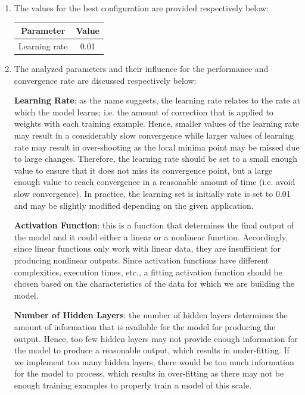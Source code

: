 \documentclass[12pt,a4paper]{article}
\begin{document}
	\begin{enumerate}
		\item The values for the best configuration are provided respectively below:
		\begin{center}
			
			\begin{tabular}{|c|c|}
				\hline
				Parameter& Value \\ \hline
				Learning rate& 0.01 \\ \hline
			\end{tabular}
		\end{center}
	
		\item The analyzed parameters and their influence for the performance and convergence rate are discussed respectively below:
		
		\noindent \textbf{\small Learning Rate}: as the name suggests, the learning rate relates to the rate at which the model learns; i.e. the amount of correction that is applied to weights with each training example. Hence, smaller values of the learning rate may result in a considerably slow convergence while larger values of learning rate may result in over-shooting as the local minima point may be missed due to large changes. Therefore, the learning rate should be set to a small enough value to ensure that it does not miss its convergence point, but a large enough value to reach convergence in a reasonable amount of time (i.e. avoid slow convergence). In practice, the learning set is initially rate is set to 0.01 and may be slightly modified depending on the given application.
		
		\noindent \textbf{\small Activation Function}: this is a function that determines the final output of the model and it could either a linear or a nonlinear function. Accordingly, since linear functions only work with linear data, they are insufficient for producing nonlinear outputs. Since activation functions have different complexities, execution times, etc., a fitting activation function should be chosen based on the characteristics of the data for which we are building the model. 
		
		\noindent \textbf{\small Number of Hidden Layers}: the number of hidden layers determines the amount of information that is available for the model for producing the output. Hence, too few hidden layers may not provide enough information for the model to produce a reasonable output, which results in under-fitting. If we implement too many hidden layers, there would be too much information for the model to process, which results in over-fitting as there may not be enough training examples to properly train a model of this scale.
		

\end{enumerate}
\end{document}
